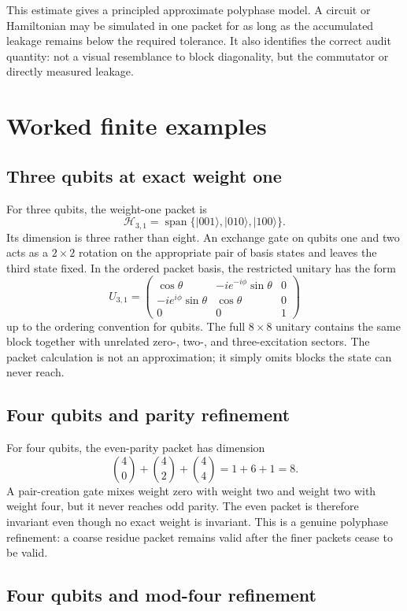 \documentclass[11pt]{article}
\newcommand{\Hh}{\mathcal H}
\begin{document}
This estimate gives a principled approximate polyphase model.  A circuit or Hamiltonian may be simulated in one packet for as long as the accumulated leakage remains below the required tolerance.  It also identifies the correct audit quantity: not a visual resemblance to block diagonality, but the commutator or directly measured leakage.

\section{Worked finite examples}

\subsection{Three qubits at exact weight one}

For three qubits, the weight-one packet is
\[
        \Hh_{3,1}=\operatorname{span}\{|001\rangle,|010\rangle,|100\rangle\}.
\]
Its dimension is three rather than eight.  An exchange gate on qubits one and two acts as a $2\times2$ rotation on the appropriate pair of basis states and leaves the third state fixed.  In the ordered packet basis, the restricted unitary has the form
\[
        U_{3,1}=\begin{pmatrix}
        \cos\theta&-ie^{-i\phi}\sin\theta&0\\
        -ie^{i\phi}\sin\theta&\cos\theta&0\\
        0&0&1
        \end{pmatrix}
\]
up to the ordering convention for qubits.  The full $8\times8$ unitary contains the same block together with unrelated zero-, two-, and three-excitation sectors.  The packet calculation is not an approximation; it simply omits blocks the state can never reach.

\subsection{Four qubits and parity refinement}

For four qubits, the even-parity packet has dimension
\[
        \binom40+\binom42+\binom44=1+6+1=8.
\]
A pair-creation gate mixes weight zero with weight two and weight two with weight four, but it never reaches odd parity.  The even packet is therefore invariant even though no exact weight is invariant.  This is a genuine polyphase refinement: a coarse residue packet remains valid after the finer packets cease to be valid.

\subsection{Four qubits and mod-four refinement}
\end{document}
